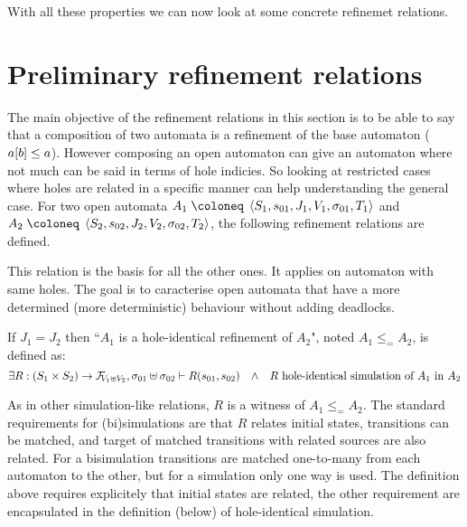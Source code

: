 \documentclass{article}
\begin{document}
With all these properties we can now look at some concrete refinemet relations.


\section{Preliminary refinement relations}
The main objective of the refinement relations in this section is to be able to say that a composition of two automata is a refinement of the base automaton (\(a{\left[b\right]} \leq a\)).
However composing an open automaton can give an automaton where not much can be said in terms of hole indicies.
So looking at restricted cases where holes are related in a specific manner can help understanding the general case.
For two open automata \(A_1 \defobject \OA{S_1}{s_{01}}{J_1}{V_1}{\sigma_{01}}{T_1}\) and \(A_2 \defobject \OA{S_2}{s_{02}}{J_2}{V_2}{\sigma_{02}}{T_2}\), the following refinement relations are defined.

This relation is the basis for all the other ones.
It applies on automaton with same holes.
The goal is to caracterise open automata that have a more determined (more deterministic) behaviour without adding deadlocks.
\begin{defi} %
If \(J_1 = J_2\) then ``\(A_1\) is a hole-identical refinement of \(A_2\)", noted \(A_1 \leq_= A_2\), is defined as:
\[ \exists R: \mpar{S_1 \times S_2} \to \rformulae[V_1 \uplus V_2], \sigma_{01} \uplus \sigma_{02} \vdash R\mpar{s_{01}, s_{02}} \qwedge R \text{ hole-identical simulation of } A_1 \text{ in } A_2 \]
\end{defi}
As in other simulation-like relations, \(R\) is a witness of \(A_1 \leq_= A_2\).
The standard requirements for (bi)simulations are that \(R\) relates initial states, transitions can be matched, and target of matched transitions with related sources are also related.
For a bisimulation transitions are matched one-to-many from each automaton to the other, but for a simulation only one way is used.
The definition above requires explicitely that initial states are related, the other requirement are encapsulated in the definition (below) of hole-identical simulation.
\end{document}
